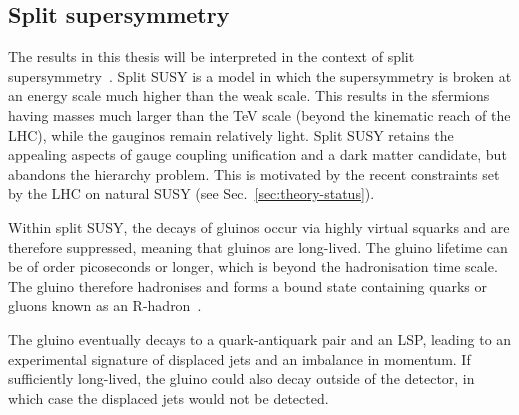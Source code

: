 \subsection{Split supersymmetry}
\label{sec:theory-splitsusy}
The results in this thesis will be interpreted in the context of split 
supersymmetry~\cite{splitsusy1,splitsusy2}. Split SUSY is a model in which the 
supersymmetry is broken at an energy scale much higher than the weak scale. 
This results in the sfermions having masses much larger than the TeV scale 
(beyond the kinematic reach of the LHC), while the gauginos remain relatively 
light. %
Split SUSY retains the appealing aspects of gauge coupling unification 
and a dark matter candidate, but abandons the hierarchy problem. This is 
motivated by the recent constraints set by the LHC on natural SUSY (see 
Sec.~\ref{sec:theory-status}).

Within split SUSY, the decays of gluinos occur via highly virtual squarks and 
are therefore suppressed, meaning that gluinos are long-lived. 
The gluino lifetime can be of order picoseconds or longer, which is beyond the 
hadronisation time scale. The gluino therefore hadronises and forms a bound 
state containing quarks or gluons known as an R-hadron~\cite{rhadron}. 

The gluino eventually decays to 
a quark-antiquark pair and an LSP, leading to an experimental signature of 
displaced jets and an imbalance in momentum. If sufficiently long-lived, the 
gluino could also decay outside of the detector, in which case the displaced 
jets would not be detected.


